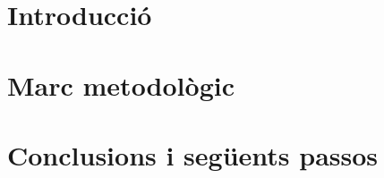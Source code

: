 \documentclass[a4paper]{book}
\begin{document}
 

    
    
    \thispagestyle{empty} %
    
    \thispagestyle{empty}
    
    \pagestyle{plain}
    
    
    

    
    \pagestyle{fancy}

    \part{Introducció} %
    
    
    \part{Marc metodològic} %
    
    
    \part{Conclusions i següents passos} %
    
    
    
    
\end{document}
